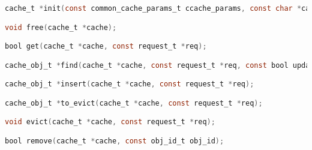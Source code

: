\lstset{style=CStyle}

\begin{lstlisting}[language=C, caption=Required functions for cache eviction algorithms in libCacheSim, label=code: cache-functions, captionpos=t]
cache_t *init(const common_cache_params_t ccache_params, const char *cache_specific_params);

void free(cache_t *cache);

bool get(cache_t *cache, const request_t *req);

cache_obj_t *find(cache_t *cache, const request_t *req, const bool update_cache);

cache_obj_t *insert(cache_t *cache, const request_t *req);

cache_obj_t *to_evict(cache_t *cache, const request_t *req);

void evict(cache_t *cache, const request_t *req);

bool remove(cache_t *cache, const obj_id_t obj_id);
\end{lstlisting}